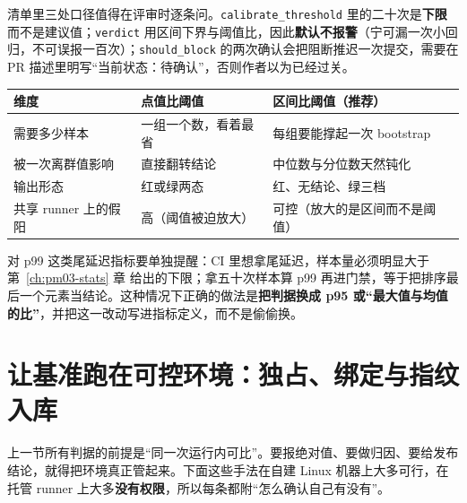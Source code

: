 \documentclass[12pt,a4paper,fontset=fandol]{ctexbook}
\newcommand{\Tp}[1]{\texttt{#1}}
\newcommand{\Bk}{\discretionary{}{}{}}
\newcommand{\Mx}[1]{\textsf{#1}}
\begin{document}
清单里三处口径值得在评审时逐条问。\Tp{calibrate{\Bk}\_threshold} 里的二十次是\textbf{下限}而不是建议值；\Tp{verdict} 用区间下界与阈值比，因此\textbf{默认不报警}（宁可漏一次小回归，不可误报一百次）；\Tp{should{\Bk}\_block} 的两次确认会把阻断推迟一次提交，需要在 PR 描述里明写``当前状态：待确认''，否则作者以为已经过关。

\begin{compare}[title={两种判据在同一批数据上的行为差别}]
\label{box:pm13-two-rules}
\begin{tabular}{>{\raggedright\arraybackslash}p{}%
>{\raggedright\arraybackslash}p{}%
>{\raggedright\arraybackslash}p{}}
\hline
\textbf{维度} & \textbf{点值比阈值} & \textbf{区间比阈值（推荐）}\\
\hline
需要多少样本 & 一组一个数，看着最省 & 每组要能撑起一次 bootstrap\\
\hline
被一次离群值影响 & 直接翻转结论 & 中位数与分位数天然钝化\\
\hline
输出形态 & 红或绿两态 & 红、无结论、绿三档\\
\hline
共享 runner 上的假阳 & 高（阈值被迫放大） & 可控（放大的是区间而不是阈值）\\
\hline
\end{tabular}
\end{compare}

对 \Mx{p99} 这类尾延迟指标要单独提醒：CI 里想拿尾延迟，样本量必须明显大于 第~\ref{ch:pm03-stats} 章 给出的下限；拿五十次样本算 \Mx{p99} 再进门禁，等于把排序最后一个元素当结论。这种情况下正确的做法是\textbf{把判据换成 \Mx{p95} 或``最大值与均值的比''}，并把这一改动写进指标定义，而不是偷偷换。

\section{让基准跑在可控环境：独占、绑定与指纹入库}
\label{sec:pm13-env}

上一节所有判据的前提是``同一次运行内可比''。要报绝对值、要做归因、要给发布结论，就得把环境真正管起来。下面这些手法在自建 Linux 机器上大多可行，在托管 runner 上大多\textbf{没有权限}，所以每条都附``怎么确认自己有没有''。
\end{document}
